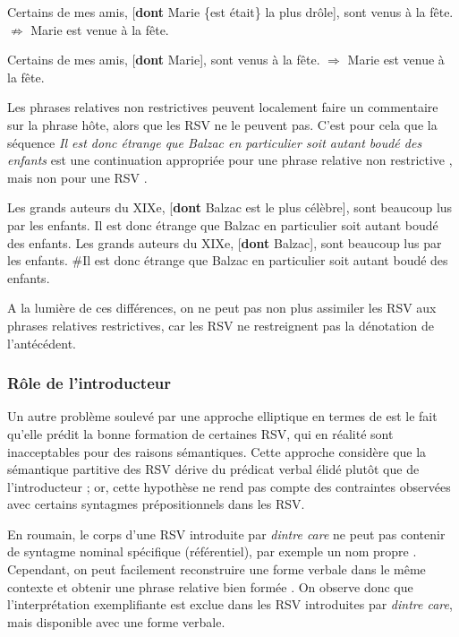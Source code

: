 \ea \label{ch3:ex105}
\ea 
Certains de mes amis, [\textbf{dont} Marie \{est {\textbar} était\} la plus drôle], sont venus à la fête.
\ex 
${\nRightarrow}$ Marie est venue à la fête.
\z 
\z 

\ea \label{ch3:ex106}
\ea 
Certains de mes amis, [\textbf{dont} Marie], sont venus à la fête.
\ex
${\Rightarrow}$ Marie est venue à la fête.
\z 
\z

Les phrases relatives non restrictives peuvent localement faire un commentaire sur la phrase hôte, alors que les RSV ne le peuvent pas. C’est pour cela que la séquence \textit{Il est donc étrange que Balzac en particulier soit autant boudé des enfants} est une continuation appropriée pour une phrase relative non restrictive , mais non pour une RSV .

\ea \label{ch3:ex107}
\ea 
Les grands auteurs du XIXe, [\textbf{dont} Balzac est le plus célèbre], sont beaucoup lus par les enfants. Il est donc étrange que Balzac en particulier soit autant boudé des enfants. \label{ch3:ex107a} 
\ex
Les grands auteurs du XIXe, [\textbf{dont} Balzac], sont beaucoup lus par les enfants. \#Il est donc étrange que Balzac en particulier soit autant boudé des enfants. \label{ch3:ex107b}
\z 
\z

A la lumière de ces différences, on ne peut pas non plus assimiler les RSV aux phrases relatives restrictives, car les RSV ne restreignent pas la dénotation de l’antécédent.


\subsubsection{Rôle de l’introducteur}\label{ch3:sect3.4.2.2}

Un autre problème soulevé par une approche elliptique en termes de  est le fait qu’elle prédit la bonne formation de certaines RSV, qui en réalité sont inacceptables pour des raisons sémantiques. Cette approche considère que la sémantique partitive des RSV dérive du prédicat verbal élidé plutôt que de l’introducteur ; or, cette hypothèse ne rend pas compte des contraintes observées avec certains syntagmes prépositionnels dans les RSV.

En roumain, le corps d’une RSV introduite par \textit{dintre care} ne peut pas contenir de syntagme nominal spécifique (référentiel), par exemple un nom propre . Cependant, on peut facilement reconstruire une forme verbale dans le même contexte et obtenir une phrase relative bien formée . On observe donc que l’interprétation exemplifiante est exclue dans les RSV introduites par \textit{dintre care}, mais disponible avec une forme verbale. 

